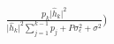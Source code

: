 \documentclass[preview]{standalone}
\begin{document}
\begin{align*}
\frac{p_k\big|{\hat{h}_k}\big|^2}{\big|{\hat{h}_k}\big|^2\sum_{j=1}^{k-1}p_j+P\sigma^2_{\epsilon} + \sigma^2} \big)
\end{align*}
\end{document}
